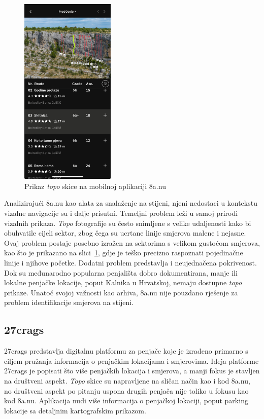 \begin{figure}[H]
    \centering
    \includegraphics[width=0.4\textwidth]{images/analiza/8anu_mobile.jpg}
    \caption{Prikaz \textit{topo} skice na mobilnoj aplikaciji 8a.nu}
    \label{fig:8anu_mobile}
\end{figure}


Analizirajući 8a.nu kao alata za snalaženje na stijeni, njeni nedostaci u kontekstu vizalne navigacije su i dalje prisutni. Temeljni problem leži u samoj prirodi vizalnih prikaza. \textit{Topo} fotografije su često snimljene s velike udaljenosti kako bi obuhvatile cijeli sektor, zbog čega su ucrtane linije smjerova malene i nejasne. Ovaj problem postaje posebno izražen na sektorima s velikom gustoćom smjerova, kao što je prikazano na slici~\ref{fig:8anu_mobile}, gdje je teško precizno raspoznati pojedinačne linije i njihove početke. Dodatni problem predstavlja i neujednačena pokrivenost. Dok su međunarodno popularna penjališta dobro dokumentirana, manje ili lokalne penjačke lokacije, poput Kalnika u Hrvatskoj, nemaju dostupne \textit{topo} prikaze. Unatoč svojoj važnosti kao arhiva, 8a.nu nije pouzdano rješenje za problem identifikacije smjerova na stijeni.

\subsection{27crags}

27crags predstavlja digitalnu platformu za penjače koje je izrađeno primarno s ciljem pružanja informacija o penjačkim lokacijama i smjerovima. Ideja platforme 27crags je popisati što više penjačkih lokacija i smjerova, a manji fokus je stavljen na društveni aspekt. \textit{Topo} skice su napravljene na sličan način kao i kod 8a.nu, no društveni aspekt po pitanju uspona drugih penjača nije toliko u fokusu kao kod 8a.nu. Aplikacija nudi više informacija o penjačkoj lokaciji, poput parking lokacije sa detaljnim kartografskim prikazom.

